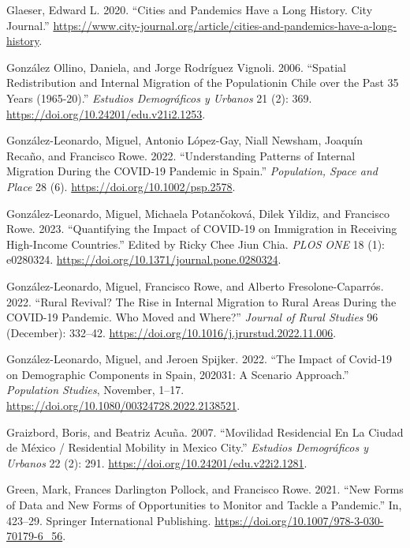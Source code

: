 \documentclass[11pt,letterpaper]{article}
\newlength{\cslhangindent}
\newlength{\cslentryspacingunit} %
\newenvironment{CSLReferences}[2] %
 {%
  \setlength{\parindent}{0pt}
  \ifodd #1
  \let\oldpar\par
  \def\par{\hangindent=\cslhangindent\oldpar}
  \fi
  \setlength{\parskip}{#2\cslentryspacingunit}
 }%
 {}
\begin{document}
\begin{CSLReferences}{1}{0}
Glaeser, Edward L. 2020. {``Cities and Pandemics Have a Long History.
City Journal.''}
\url{https://www.city-journal.org/article/cities-and-pandemics-have-a-long-history}.

González Ollino, Daniela, and Jorge Rodríguez Vignoli. 2006. {``Spatial
Redistribution and Internal Migration of the Populationin Chile over the
Past 35 Years (1965-20).''} \emph{Estudios Demográficos y Urbanos} 21
(2): 369. \url{https://doi.org/10.24201/edu.v21i2.1253}.

González-Leonardo, Miguel, Antonio López-Gay, Niall Newsham, Joaquín
Recaño, and Francisco Rowe. 2022. {``Understanding Patterns of Internal
Migration During the COVID{-}19 Pandemic in Spain.''} \emph{Population,
Space and Place} 28 (6). \url{https://doi.org/10.1002/psp.2578}.

González-Leonardo, Miguel, Michaela Potančoková, Dilek Yildiz, and
Francisco Rowe. 2023. {``Quantifying the Impact of COVID-19 on
Immigration in Receiving High-Income Countries.''} Edited by Ricky Chee
Jiun Chia. \emph{PLOS ONE} 18 (1): e0280324.
\url{https://doi.org/10.1371/journal.pone.0280324}.

González-Leonardo, Miguel, Francisco Rowe, and Alberto
Fresolone-Caparrós. 2022. {``Rural Revival? The Rise in Internal
Migration to Rural Areas During the COVID-19 Pandemic. Who Moved and
Where?''} \emph{Journal of Rural Studies} 96 (December): 332--42.
\url{https://doi.org/10.1016/j.jrurstud.2022.11.006}.

González-Leonardo, Miguel, and Jeroen Spijker. 2022. {``The Impact of
Covid-19 on Demographic Components in Spain, 2020{\textendash}31: A
Scenario Approach.''} \emph{Population Studies}, November, 1--17.
\url{https://doi.org/10.1080/00324728.2022.2138521}.

Graizbord, Boris, and Beatriz Acuña. 2007. {``Movilidad Residencial En
La Ciudad de México / Residential Mobility in Mexico City.''}
\emph{Estudios Demográficos y Urbanos} 22 (2): 291.
\url{https://doi.org/10.24201/edu.v22i2.1281}.

Green, Mark, Frances Darlington Pollock, and Francisco Rowe. 2021.
{``New Forms of Data and New Forms of Opportunities to Monitor and
Tackle a Pandemic.''} In, 423--29. Springer International Publishing.
\url{https://doi.org/10.1007/978-3-030-70179-6_56}.


\end{CSLReferences}
\end{document}
